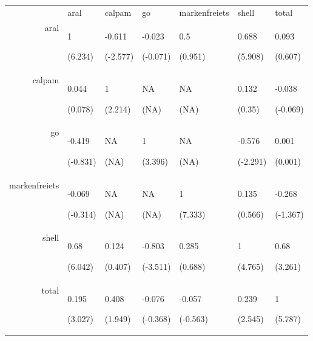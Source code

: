 \begin{table}[ht]
\centering
\begin{tabular}{rllllll}
  & aral & calpam & go & markenfreiets & shell & total \\ 
 aral & 1\par (6.234) & -0.611\par (-2.577) & -0.023\par (-0.071) & 0.5\par (0.951) & 0.688\par (5.908) & 0.093\par (0.607) \\ 
  calpam & 0.044\par (0.078) & 1\par (2.214) & NA\par (NA) & NA\par (NA) & 0.132\par (0.35) & -0.038\par (-0.069) \\ 
  go & -0.419\par (-0.831) & NA\par (NA) & 1\par (3.396) & NA\par (NA) & -0.576\par (-2.291) & 0.001\par (0.001) \\ 
  markenfreiets & -0.069\par (-0.314) & NA\par (NA) & NA\par (NA) & 1\par (7.333) & 0.135\par (0.566) & -0.268\par (-1.367) \\ 
  shell & 0.68\par (6.042) & 0.124\par (0.407) & -0.803\par (-3.511) & 0.285\par (0.688) & 1\par (4.765) & 0.68\par (3.261) \\ 
  total & 0.195\par (3.027) & 0.408\par (1.949) & -0.076\par (-0.368) & -0.057\par (-0.563) & 0.239\par (2.545) & 1\par (5.787) \\ 
  \end{tabular}
\end{table}
